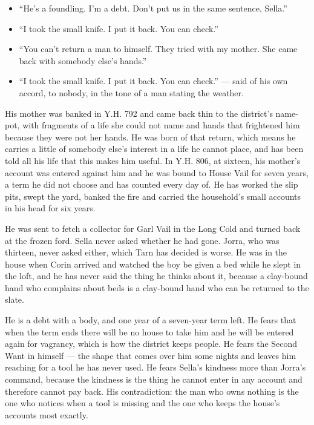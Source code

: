 \documentclass{design/chronicle}
\begin{document}
{\begin{itemize}[leftmargin=1.4em,itemsep=1pt,topsep=3pt,parsep=0pt]
\item “He’s a foundling. I’m a debt. Don’t put us in the same sentence, Sella.”

\item “I took the small knife. I put it back. You can check.”

\item “You can’t return a man to himself. They tried with my mother. She came back with somebody else’s hands.”

\item “I took the small knife. I put it back. You can check.” --- said of his own accord, to nobody, in the tone of a man stating the weather.

\end{itemize}

His mother was banked in Y.H. 792 and came back thin to the district’s name-pot, with fragments of a life she could not name and hands that frightened him because they were not her hands. He was born of that return, which means he carries a little of somebody else’s interest in a life he cannot place, and has been told all his life that this makes him useful. In Y.H. 806, at sixteen, his mother’s account was entered against him and he was bound to House Vail for seven years, a term he did not choose and has counted every day of. He has worked the slip pits, swept the yard, banked the fire and carried the household’s small accounts in his head for six years.

He was sent to fetch a collector for Garl Vail in the Long Cold and turned back at the frozen ford. Sella never asked whether he had gone. Jorra, who was thirteen, never asked either, which Tarn has decided is worse. He was in the house when Corin arrived and watched the boy be given a bed while he slept in the loft, and he has never said the thing he thinks about it, because a clay-bound hand who complains about beds is a clay-bound hand who can be returned to the slate.

He is a debt with a body, and one year of a seven-year term left. He fears that when the term ends there will be no house to take him and he will be entered again for vagrancy, which is how the district keeps people. He fears the Second Want in himself — the shape that comes over him some nights and leaves him reaching for a tool he has never used. He fears Sella’s kindness more than Jorra’s command, because the kindness is the thing he cannot enter in any account and therefore cannot pay back. His contradiction: the man who owns nothing is the one who notices when a tool is missing and the one who keeps the house’s accounts most exactly.

}
\end{document}
